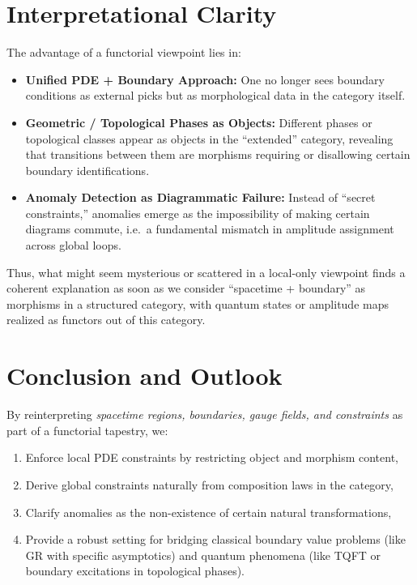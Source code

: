 \documentclass[12pt]{article}
\begin{document}
\section{Interpretational Clarity}
\label{sec:Interpretation}
The advantage of a functorial viewpoint lies in:
\begin{itemize}[label=$\diamond$]
    \item \textbf{Unified PDE + Boundary Approach:} One no longer sees boundary conditions as external picks but
    as morphological data in the category itself.
    \item \textbf{Geometric / Topological Phases as Objects:} Different phases or topological classes appear as objects in the
    “extended” category, revealing that transitions between them are morphisms requiring or disallowing certain boundary identifications.
    \item \textbf{Anomaly Detection as Diagrammatic Failure:} Instead of “secret constraints,” anomalies emerge as the
    impossibility of making certain diagrams commute, i.e.\ a fundamental mismatch in amplitude assignment across global loops.
\end{itemize}
Thus, what might seem mysterious or scattered in a local-only viewpoint finds a coherent explanation as soon as we
consider “spacetime + boundary” as morphisms in a structured category, with quantum states or amplitude maps
realized as functors out of this category.

\section{Conclusion and Outlook}
By reinterpreting \emph{spacetime regions, boundaries, gauge fields, and constraints} as part of a functorial tapestry, we:
\begin{enumerate}[label=(\alph*)]
    \item Enforce local PDE constraints by restricting object and morphism content,
    \item Derive global constraints naturally from composition laws in the category,
    \item Clarify anomalies as the non-existence of certain natural transformations,
    \item Provide a robust setting for bridging classical boundary value problems (like GR with specific asymptotics)
          and quantum phenomena (like TQFT or boundary excitations in topological phases).
\end{enumerate}
\end{document}
